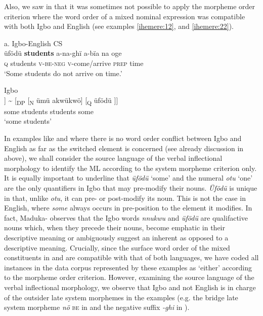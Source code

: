 \documentclass[output=paper]{langsci/langscibook}
\begin{document}
Also, we saw in  that it was sometimes not possible to apply the morpheme order criterion where the word order of a mixed nominal expression was compatible with both Igbo and English (see examples \ref{ihemere:12}, and \ref{ihemere:22}).

\ea
{a. Igbo-English CS}\\
\gll üfödü  \textbf{students}\textbf{}  a-na-ghï   a-bïa    na   oge\\
     \textsc{q}     students  \textsc{v-be-neg}  \textsc{v}-come/arrive  \textsc{prep}  time   \\
\glt ‘Some students do not arrive on time.’
\z

\ea
{Igbo} \\
\gll [\textsubscript{DP} [\textsubscript{Q} üfödü]  [\textsubscript{N} ümü akwükwö]] {\textasciitilde} [\textsubscript{DP} [\textsubscript{N}  ümü akwükwö]  [\textsubscript{Q} üfödü\textsubscript{} ]]\\
           some      students              students        some\\
\glt ‘some students’
\z

In examples like  and  where there is no word order conflict between Igbo and English as far as the switched element is concerned (see already discussion in  above), we shall consider the source language of the verbal inflectional morphology to identify the ML according to the system morpheme criterion only. It is equally important to underline that \textit{üfödü} ‘some’ and the numeral \textit{otu} ‘one’ are the only quantifiers in Igbo that may pre-modify their nouns. \textit{Üfödü} is unique in that, unlike \textit{otu}, it can pre- or post-modify its noun. This is not the case in English, where \textit{some} always occurs in pre-position to the element it modifies. In fact, Maduka-\citet[239]{Durunze1990} observes that the Igbo words \textit{nnukwu} and \textit{üfödü} are qualifactive nouns which, when they precede their nouns, become emphatic in their descriptive meaning or ambiguously suggest an inherent as opposed to a descriptive meaning. Crucially, since the surface word order of the mixed constituents in  and  are compatible with that of both languages, we have coded all instances in the data corpus represented by these examples as ‘either’ according to the morpheme order criterion. However, examining the source language of the verbal inflectional morphology, we observe that Igbo and not English is in charge of the outsider late system morphemes in the examples (e.g. the bridge late system morpheme \textit{nö} \textsc{be} in  and the negative suffix \textit{-ghi} in ). 
\end{document}
